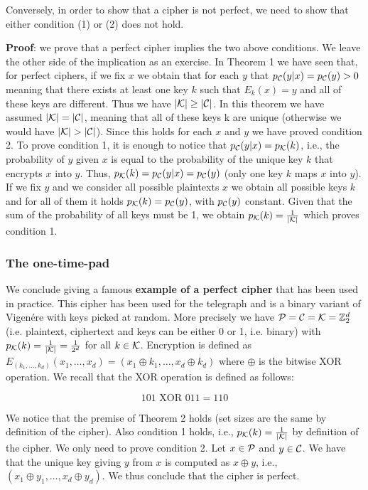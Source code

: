 Conversely, in order to show that a cipher is not perfect, we need to show that either condition (1) or (2) does not hold.

\textbf{Proof}: we prove that a perfect cipher implies the two above conditions. We leave the other side of the implication as an exercise. In Theorem 1 we have seen that, for perfect ciphers, if we fix $x$ we obtain that for each $y$ that $p_{\cal C}(y|x)=p_{\cal C}(y)>0$ meaning that there exists at least one key $k$ such that $E_k(x) = y$ and all of these keys are different. Thus we have $|{\cal K}| \geq |{\cal C}|$. In this theorem we have assumed $|{\cal K}| = |{\cal C}|$, meaning that all of these keys k are unique (otherwise we would have $|{\cal K}| > |{\cal C}|$). Since this holds for each $x$ and $y$ we have proved condition 2. To prove condition 1, it is enough to notice that $p_{\cal C}(y|x)=p_{\cal K}(k)$, i.e., the probability of $y$ given $x$ is equal to the probability of the unique key $k$ that encrypts $x$ into $y$. Thus, $p_{\cal K}(k) = p_{\cal C}(y|x)=p_{\cal C}(y)$ (only one key $k$ maps $x$ into $y$). If we fix $y$ and we consider all possible plaintexts $x$ we obtain all possible keys $k$ and for all of them it holds $p_{\cal K}(k) =p_{\cal C}(y)$, with $p_{\cal C}(y)$ constant. Given that the sum of the probability of all keys must be 1, we obtain $p_{\cal K}(k) = \frac{1}{|{\cal K}|}$ which proves condition 1.

\subsubsection{The one-time-pad}
We conclude giving a famous \textbf{example of a perfect cipher} that has been used in practice. This cipher has been used for the telegraph and is a binary variant of Vigenére with keys picked at random. More precisely we have ${\cal P} = {\cal C}= {\cal K} = \mathbb{Z}_2^d$ (i.e. plaintext, ciphertext and keys can be either 0 or 1, i.e. binary) with $p_{\cal K}(k) = \frac{1}{|{\cal K}|} = \frac{1}{2^d}$ for all $k \in {\cal K}$. Encryption is defined as $E_{(k_1, \ldots, k_d)}(x_1,\ldots,x_d) = (x_1 \oplus k_1, \ldots, x_d \oplus k_d)$ where $\oplus$ is the bitwise XOR operation. We recall that the XOR operation is defined as follows: 

$$
101 \text{ XOR } 011 = 110
$$

We notice that the premise of Theorem 2 holds (set sizes are the same by definition of the cipher). Also condition 1 holds, i.e., $p_{\cal K}(k) = \frac{1}{|{\cal K}|}$ by definition of the cipher. We only need to prove condition 2. Let $x \in {\cal P}$ and $y \in {\cal C}$. We have that the unique key giving $y$ from $x$ is computed as $x \oplus y$, i.e., $(x_1 \oplus y_1, \ldots, x_d \oplus y_d)$. We thus conclude that the cipher is perfect.

